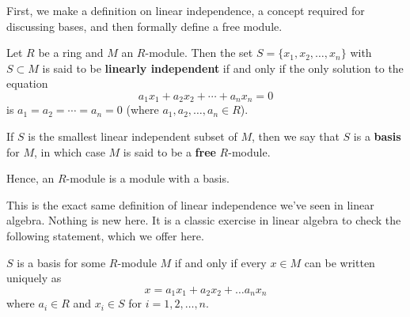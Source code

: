 \documentclass[12pt,letterpaper]{algebra_book}
\theoremstyle{definition}
\begin{document}
First, we make a definition on linear independence, a concept
required for discussing bases, and then formally define a free module.

\begin{definition}
    Let $R$ be a ring and $M$ an $R$-module. Then the set $S = \{x_1,
    x_2, \dots, x_n\}$ with $S \subset M$ is said to be
    \textbf{linearly independent} if and only if the only solution
    to the equation 
    \[
        a_1x_1 + a_2x_2 + \cdots + a_nx_n = 0
    \]
    is $a_1 = a_2 = \cdots = a_n = 0$ (where $a_1, a_2, \dots,
    a_n \in R$). 
    
    If $S$ is the smallest linear independent subset
    of $M$, then we say that $S$ is a \textbf{basis} for $M$, in
    which case $M$ is said to be a \textbf{free} $R$-module.
\end{definition}
Hence, an $R$-module is a module with a basis.

This is the exact same definition of linear independence we've
seen in linear algebra. 
Nothing is new here. It is a classic exercise in linear algebra to
check the following statement, which we offer here.

\begin{proposition}
    $S$ is a basis for some $R$-module $M$ if and only if every $x
    \in M$ can be written uniquely as 
    \[
        x = a_1x_1 + a_2x_2 + \dots a_nx_n
    \]
    where $a_i \in R$ and $x_i \in S$ for $i = 1,2, \dots, n$.
\end{proposition}
\end{document}
